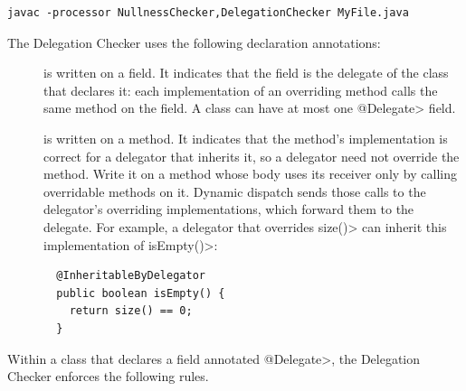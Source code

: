 \begin{Verbatim}
javac -processor NullnessChecker,DelegationChecker MyFile.java
\end{Verbatim}



The Delegation Checker uses the following declaration annotations:

\begin{description}
\item[]
  is written on a field.  It indicates that the field is the delegate of
  the class that declares it:  each implementation of an overriding method
  calls the same method on
  the field.  A class can have at most one \<@Delegate> field.
\item[]
  is written on a method.  It indicates that the method's implementation is
  correct for a delegator that inherits it, so a delegator need not
  override the method.  Write it on a method whose body uses its receiver
  only by calling overridable methods on it.  Dynamic dispatch sends those
  calls to the delegator's overriding implementations, which forward them
  to the delegate.  For example, a delegator that overrides \<size()> can
  inherit this implementation of \<isEmpty()>:
\begin{Verbatim}
  @InheritableByDelegator
  public boolean isEmpty() {
    return size() == 0;
  }
\end{Verbatim}
\end{description}



Within a class that declares a field annotated \<@Delegate>, the Delegation
Checker enforces the following rules.

